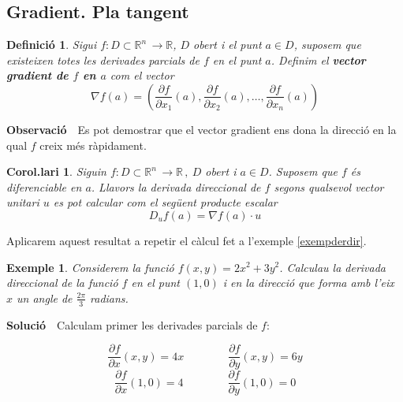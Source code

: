 \documentclass[12pt]{article}
\newcommand{\observacio}{\textbf{Observaci{\'o}}\ \ }
\newcommand{\solucio}{\textbf{Soluci{\'o}}\ \ }
\newtheorem{definicio}{Definici{\'o}}[subsection]
\newtheorem{corol}{Corol.lari}[subsection]
\newtheorem{exemple}{Exemple}[subsection]
\newcommand{\R}{\mathbb{R}}
\begin{document}
\vspace{0.4cm}
\subsection{Gradient. Pla tangent}

\vspace{0.4cm}
\begin{definicio}
Sigui $f:D\subset\R^n\, \longrightarrow\R$, $D$ obert i el punt $a\in D$, suposem que existeixen totes les derivades
parcials de $f$ en el punt $a$. Definim el \textbf{vector
gradient de $f$ en $a$} com el vector
\[
\nabla f(a)=\left(\frac{\partial f}{\partial x_1}(a),\frac{\partial f}{\partial x_2}(a), \ldots , \frac{\partial f}{\partial x_n}(a)\right)
\]
\end{definicio}

\vspace{0.4cm}
\observacio Es pot demostrar que el vector gradient ens dona la direcci{\'o} en la qual $f$ creix m{\'e}s r{\`a}pidament.


\vspace{0.4cm}
\begin{corol}\label{cor1}
Siguin $f:D\subset\R^n\, \longrightarrow\R\,,\ D$ obert i $a\in D$. Suposem que $f$ {\'e}s diferenciable en $a$. Llavors la derivada direccional de $f$
segons qualsevol vector unitari $u$  es pot calcular com el seg{\"u}ent producte escalar
\[
D_uf(a)  = \nabla f(a)\cdot u
\]
\end{corol}

Aplicarem aquest resultat a repetir el c{\`a}lcul fet a l'exemple \ref{exempderdir}.

\vspace{0.4cm}
\begin{exemple}
Considerem la funci{\'o} $f(x,y)=2x^2+3y^2$. Calculau la derivada direccional de la funci{\'o} $f$ en el punt $(1,0)$ i en la direcci{\'o} que forma amb l'eix $x$ un angle de $\frac{2\pi}{3}$ radians.
\end{exemple}

\solucio Calculam primer les derivades parcials de $f$:

$$
\frac{\partial f}{\partial x}(x,y)=4 x\qquad\qquad \frac{\partial f}{\partial y}(x,y)=6 y
$$
$$
\frac{\partial f}{\partial x}(1,0)=4 \qquad\qquad \frac{\partial f}{\partial y}(1,0)=0
$$
\end{document}
